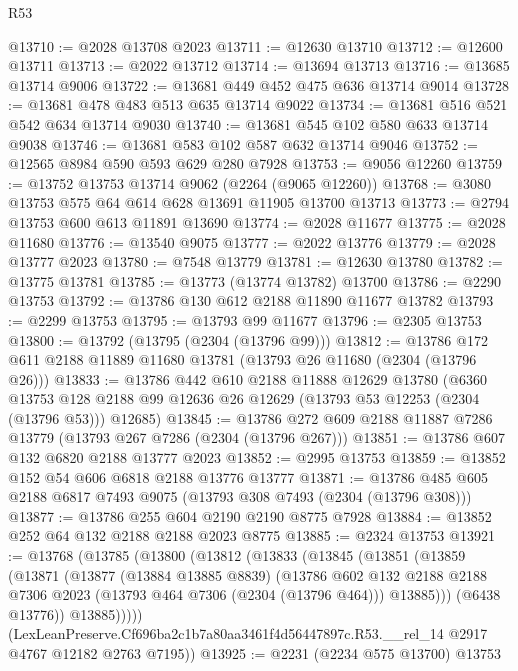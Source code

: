 \begin{lexlean}{R53}
\begin{coremodule}
@13710 := @2028 @13708 @2023
@13711 := @12630 @13710
@13712 := @12600 @13711
@13713 := @2022 @13712
@13714 := @13694 @13713
@13716 := @13685 @13714 @9006
@13722 := @13681 @449 @452 @475 @636 @13714 @9014
@13728 := @13681 @478 @483 @513 @635 @13714 @9022
@13734 := @13681 @516 @521 @542 @634 @13714 @9030
@13740 := @13681 @545 @102 @580 @633 @13714 @9038
@13746 := @13681 @583 @102 @587 @632 @13714 @9046
@13752 := @12565 @8984 @590 @593 @629 @280 @7928
@13753 := @9056 @12260
@13759 := @13752 @13753 @13714 @9062 (@2264 (@9065 @12260))
@13768 := @3080 @13753 @575 @64 @614 @628 @13691 @11905 @13700 @13713
@13773 := @2794 @13753 @600 @613 @11891 @13690
@13774 := @2028 @11677
@13775 := @2028 @11680
@13776 := @13540 @9075
@13777 := @2022 @13776
@13779 := @2028 @13777 @2023
@13780 := @7548 @13779
@13781 := @12630 @13780
@13782 := @13775 @13781
@13785 := @13773 (@13774 @13782) @13700
@13786 := @2290 @13753
@13792 := @13786 @130 @612 @2188 @11890 @11677 @13782
@13793 := @2299 @13753
@13795 := @13793 @99 @11677
@13796 := @2305 @13753
@13800 := @13792 (@13795 (@2304 (@13796 @99)))
@13812 := @13786 @172 @611 @2188 @11889 @11680 @13781 (@13793 @26 @11680 (@2304 (@13796 @26)))
@13833 := @13786
    @442
    @610
    @2188
    @11888
    @12629
    @13780
    (@6360 @13753 @128 @2188 @99 @12636 @26 @12629 (@13793 @53 @12253 (@2304 (@13796 @53))) @12685)
@13845 := @13786 @272 @609 @2188 @11887 @7286 @13779 (@13793 @267 @7286 (@2304 (@13796 @267)))
@13851 := @13786 @607 @132 @6820 @2188 @13777 @2023
@13852 := @2995 @13753
@13859 := @13852 @152 @54 @606 @6818 @2188 @13776 @13777
@13871 := @13786 @485 @605 @2188 @6817 @7493 @9075 (@13793 @308 @7493 (@2304 (@13796 @308)))
@13877 := @13786 @255 @604 @2190 @2190 @8775 @7928
@13884 := @13852 @252 @64 @132 @2188 @2188 @2023 @8775
@13885 := @2324 @13753
@13921 := @13768
    (@13785
      (@13800
        (@13812
          (@13833
            (@13845
              (@13851
                (@13859
                  (@13871
                    (@13877
                      (@13884 @13885 @8839)
                      (@13786
                        @602
                        @132
                        @2188
                        @2188
                        @7306
                        @2023
                        (@13793 @464 @7306 (@2304 (@13796 @464)))
                        @13885)))
                  (@6438 @13776))
                @13885)))))
      (LexLeanPreserve.Cf696ba2c1b7a80aa3461f4d56447897c.R53.__rel_14
        @2917
        @4767
        @12182
        @2763
        @7195))
@13925 := @2231 (@2234 @575 @13700) @13753

\end{coremodule}
\end{lexlean}
